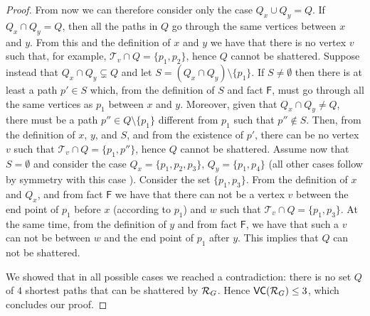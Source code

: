 \begin{proof}
  From now we can therefore consider only the case $Q_x\cup Q_y=Q$. If $Q_x\cap
  Q_y=Q$, then all the paths in $Q$ go through the same vertices between $x$ and
  $y$. From this and the definition of $x$ and $y$ we have that there is no
  vertex $v$ such that, for example, $\mathcal{T}_v\cap Q=\{p_1,p_2\}$, hence
  $Q$ cannot be shattered. Suppose instead that $Q_x\cap Q_y\subsetneq Q$ and let $S=(Q_x\cap
  Q_y)\setminus\{p_1\}$. If $S\neq\emptyset$ then there is at least a path
  $p'\in S$ which, from the definition of $S$ and fact $\mathsf{F}$, must go
  through all the same vertices as $p_1$ between $x$ and $y$. Moreover, given
  that $Q_x\cap Q_y\neq Q$, there must be a path $p''\in Q\setminus\{p_1\}$
  different from $p_1$ such that $p''\notin S$. Then, from the definition of
  $x$, $y$, and $S$, and from the existence of $p'$, there can be no vertex $v$
  such that $\mathcal{T}_v\cap Q=\{p_1,p''\}$, hence $Q$ cannot be shattered.
  Assume now that $S=\emptyset$ and consider the case $Q_x=\{p_1,p_2,p_3\}$,
  $Q_y=\{p_1,p_4\}$ (all other cases follow by symmetry with this case ).
  Consider the set $\{p_1,p_3\}$. From the definition of $x$ and $Q_x$, and from
  fact $\mathsf{F}$ we have that there can not be a vertex $v$ between the end
  point of $p_1$ before $x$ (according to $p_1$) and $w$ such that $\mathcal{T}_v\cap Q=\{p_1,p_3\}$.
  At the same time, from the definition of $y$ and from fact $\mathsf{F}$, we
  have that such a $v$ can not be between $w$ and the end point of $p_1$ after
  $y$. This implies that $Q$ can not be shattered.

  We showed that in all possible cases we reached a contradiction: there is no
  set $Q$ of $4$ shortest paths that can be shattered by $\mathcal{R}_G$. Hence
  $\mathsf{VC}(\mathcal{R}_G)\le 3$, which concludes our proof.
\end{proof}

